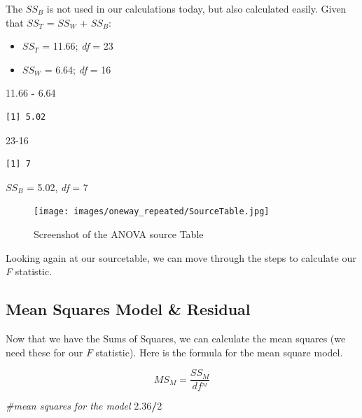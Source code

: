\documentclass[
  11pt,
]{book}
\newenvironment{Shaded}{\begin{snugshade}}{\end{snugshade}}
\newcommand{\CommentTok}[1]{\textcolor[rgb]{0.37,0.37,0.37}{\textit{#1}}}
\newcommand{\DecValTok}[1]{\textcolor[rgb]{0.06,0.06,0.06}{#1}}
\newcommand{\FloatTok}[1]{\textcolor[rgb]{0.06,0.06,0.06}{#1}}
\newcommand{\SpecialCharTok}[1]{\textcolor[rgb]{0.43,0.43,0.43}{\textbf{#1}}}
\providecommand{\tightlist}{%
  \setlength{\itemsep}{0pt}\setlength{\parskip}{0pt}}
\begin{document}
The \(SS_B\) is not used in our calculations today, but also calculated easily. Given that \(SS_T\) = \(SS_W\) + \(SS_B\):

\begin{itemize}
\tightlist
\item
  \(SS_T\) = 11.66; \emph{df} = 23
\item
  \(SS_W\) = 6.64; \emph{df} = 16
\end{itemize}

\begin{Shaded}
\begin{Highlighting}[]
\FloatTok{11.66} \SpecialCharTok{{-}} \FloatTok{6.64}
\end{Highlighting}
\end{Shaded}

\begin{verbatim}
[1] 5.02
\end{verbatim}

\begin{Shaded}
\begin{Highlighting}[]
\DecValTok{23{-}16}
\end{Highlighting}
\end{Shaded}

\begin{verbatim}
[1] 7
\end{verbatim}

\(SS_B\) = 5.02, \emph{df} = 7

\begin{figure}
\centering
\texttt{[image: images/oneway\_repeated/SourceTable.jpg]}
\caption{Screenshot of the ANOVA source Table}
\end{figure}

Looking again at our sourcetable, we can move through the steps to calculate our \emph{F} statistic.

\hypertarget{mean-squares-model-residual-1}{%
\subsection{Mean Squares Model \& Residual}\label{mean-squares-model-residual-1}}

Now that we have the Sums of Squares, we can calculate the mean squares (we need these for our \(F\) statistic). Here is the formula for the mean square model.

\[MS_M = \frac{SS_{M}}{df^{_{M}}}\]

\begin{Shaded}
\begin{Highlighting}[]
\CommentTok{\#mean squares for the model}
\FloatTok{2.36}\SpecialCharTok{/}\DecValTok{2}
\end{Highlighting}
\end{Shaded}
\end{document}
